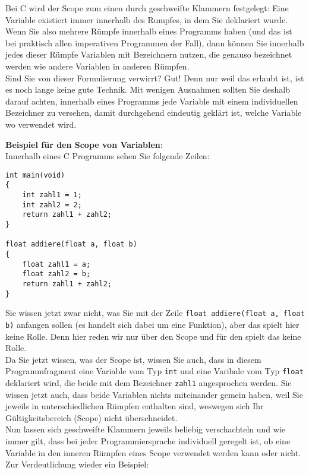 Bei C wird der Scope zum einen durch geschweifte Klammern festgelegt: Eine Variable existiert immer innerhalb des Rumpfes, in dem Sie deklariert wurde. Wenn Sie also mehrere Rümpfe innerhalb eines Programms haben (und das ist bei praktisch allen imperativen Programmen der Fall), dann können Sie innerhalb jedes dieser Rümpfe Variablen mit Bezeichnern nutzen, die genauso bezeichnet werden wie andere Variablen in anderen Rümpfen.\\

Sind Sie von dieser Formulierung verwirrt? Gut! Denn nur weil das erlaubt ist, ist es noch lange keine gute Technik. Mit wenigen Ausnahmen sollten Sie deshalb darauf achten, innerhalb eines Programms jede Variable mit einem individuellen Bezeichner zu versehen, damit durchgehend eindeutig geklärt ist, welche Variable wo verwendet wird.

\textbf{Beispiel für den Scope von Variablen}:\\

Innerhalb eines C Programms sehen Sie folgende Zeilen:\\

\begin{verbatim}
int main(void)
{
	int zahl1 = 1;
	int zahl2 = 2;
	return zahl1 + zahl2;
}

float addiere(float a, float b)
{
	float zahl1 = a;
	float zahl2 = b;
	return zahl1 + zahl2;
}
\end{verbatim}

Sie wissen jetzt zwar nicht, was Sie mit der Zeile \verb|float addiere(float a, float b)| anfangen sollen (es handelt sich dabei um eine Funktion), aber das spielt hier keine Rolle. Denn hier reden wir nur über den Scope und für den spielt das keine Rolle.\\

Da Sie jetzt wissen, was der Scope ist, wissen Sie auch, dass in diesem Programmfragment eine Variable vom Typ \verb|int| und eine Varibale vom Typ \verb|float| deklariert wird, die beide mit dem Bezeichner \verb|zahl1| angesprochen werden. Sie wissen jetzt auch, dass beide Variablen nichts miteinander gemein haben, weil Sie jeweils in unterschiedlichen Rümpfen enthalten sind, weswegen sich Ihr Gültigkeitsbereich (Scope) nicht überschneidet.\\

Nun lassen sich geschweifte Klammern jeweils beliebig verschachteln und wie immer gilt, dass bei jeder Programmiersprache individuell geregelt ist, ob eine Variable in den inneren Rümpfen eines Scope verwendet werden kann oder nicht. Zur Verdeutlichung wieder ein Beispiel:\\


